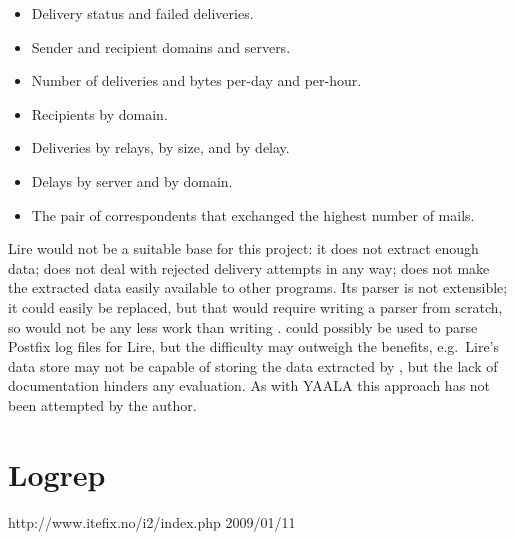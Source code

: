 \begin{itemize}

    \squeezeitems{}

    \item Delivery status and failed deliveries.

    \item Sender and recipient domains and servers.

    \item Number of deliveries and bytes per-day and per-hour.

    \item Recipients by domain.

    \item Deliveries by relays, by size, and by delay.

    \item Delays by server and by domain.

    \item The pair of correspondents that exchanged the highest number of
        mails.

\end{itemize}

Lire would not be a suitable base for this project: it does not extract
enough data; does not deal with rejected delivery attempts in any way; does
not make the extracted data easily available to other programs.  Its parser
is not extensible; it could easily be replaced, but that would require
writing a parser from scratch, so would not be any less work than writing
\parsername{}.  \parsername{} could possibly be used to parse Postfix log
files for Lire, but the difficulty may outweigh the benefits, e.g.\ Lire's
data store may not be capable of storing the data extracted by
\parsername{}, but the lack of documentation hinders any evaluation.  As
with YAALA this approach has not been attempted by the author.

\section{Logrep}

\label{Logrep review}

{http://www.itefix.no/i2/index.php}
{2009/01/11}

